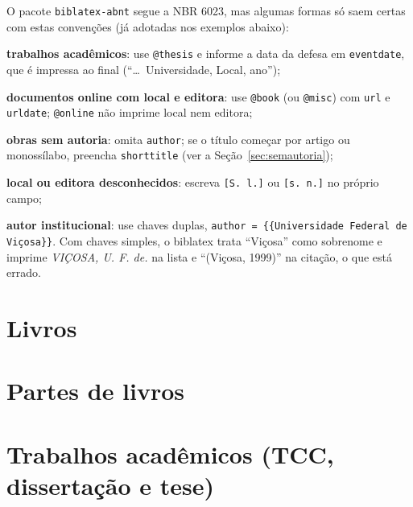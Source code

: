 O pacote \texttt{biblatex-abnt} segue a NBR 6023, mas algumas formas só saem certas
com estas convenções (já adotadas nos exemplos abaixo):
\begin{alineas}
  \item \textbf{trabalhos acadêmicos}: use \texttt{@thesis} e informe a data da defesa
        em \texttt{eventdate}, que é impressa ao final (``\ldots\ Universidade, Local, ano'');
  \item \textbf{documentos online com local e editora}: use \texttt{@book} (ou
        \texttt{@misc}) com \texttt{url} e \texttt{urldate}; \texttt{@online} não imprime
        local nem editora;
  \item \textbf{obras sem autoria}: omita \texttt{author}; se o título começar por
        artigo ou monossílabo, preencha \texttt{shorttitle} (ver a Seção~\ref{sec:semautoria});
  \item \textbf{local ou editora desconhecidos}: escreva \texttt{[S. l.]} ou \texttt{[s. n.]}
        no próprio campo;
  \item \textbf{autor institucional}: use chaves duplas,
        \texttt{author = \{\{Universidade Federal de Viçosa\}\}}. Com chaves simples, o
        biblatex trata ``Viçosa'' como sobrenome e imprime \emph{VIÇOSA, U. F. de.} na lista e
        ``(Viçosa, 1999)'' na citação, o que está errado.
\end{alineas}

\section{Livros}


\section{Partes de livros}


\section{Trabalhos acadêmicos (TCC, dissertação e tese)}

